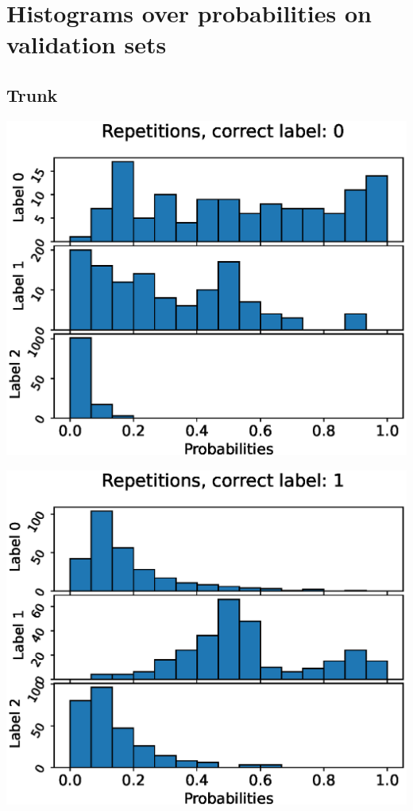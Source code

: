 \chapter{Histograms over probabilities on validation sets}
\section{Trunk}

\begin{center}
\begin{minipage}{0.33\textwidth}
  \includegraphics[width=\textwidth]{files/figs/app/hists/trunk/r0.eps}
\end{minipage}%
\begin{minipage}{0.33\textwidth}
  \includegraphics[width=\textwidth]{files/figs/app/hists/trunk/r1.eps}

\end{minipage}
\end{center}
